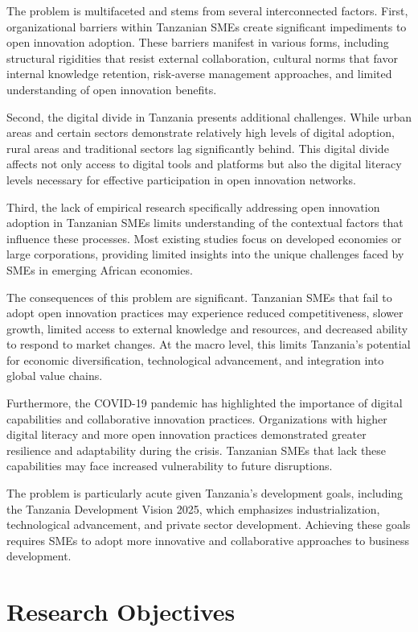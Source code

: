 \documentclass[12pt,a4paper]{article}
\begin{document}
The problem is multifaceted and stems from several interconnected factors. First, organizational barriers within Tanzanian SMEs create significant impediments to open innovation adoption. These barriers manifest in various forms, including structural rigidities that resist external collaboration, cultural norms that favor internal knowledge retention, risk-averse management approaches, and limited understanding of open innovation benefits.

Second, the digital divide in Tanzania presents additional challenges. While urban areas and certain sectors demonstrate relatively high levels of digital adoption, rural areas and traditional sectors lag significantly behind. This digital divide affects not only access to digital tools and platforms but also the digital literacy levels necessary for effective participation in open innovation networks.

Third, the lack of empirical research specifically addressing open innovation adoption in Tanzanian SMEs limits understanding of the contextual factors that influence these processes. Most existing studies focus on developed economies or large corporations, providing limited insights into the unique challenges faced by SMEs in emerging African economies.

The consequences of this problem are significant. Tanzanian SMEs that fail to adopt open innovation practices may experience reduced competitiveness, slower growth, limited access to external knowledge and resources, and decreased ability to respond to market changes. At the macro level, this limits Tanzania's potential for economic diversification, technological advancement, and integration into global value chains.

Furthermore, the COVID-19 pandemic has highlighted the importance of digital capabilities and collaborative innovation practices. Organizations with higher digital literacy and more open innovation practices demonstrated greater resilience and adaptability during the crisis. Tanzanian SMEs that lack these capabilities may face increased vulnerability to future disruptions.

The problem is particularly acute given Tanzania's development goals, including the Tanzania Development Vision 2025, which emphasizes industrialization, technological advancement, and private sector development. Achieving these goals requires SMEs to adopt more innovative and collaborative approaches to business development.

\section{Research Objectives}
\end{document}
